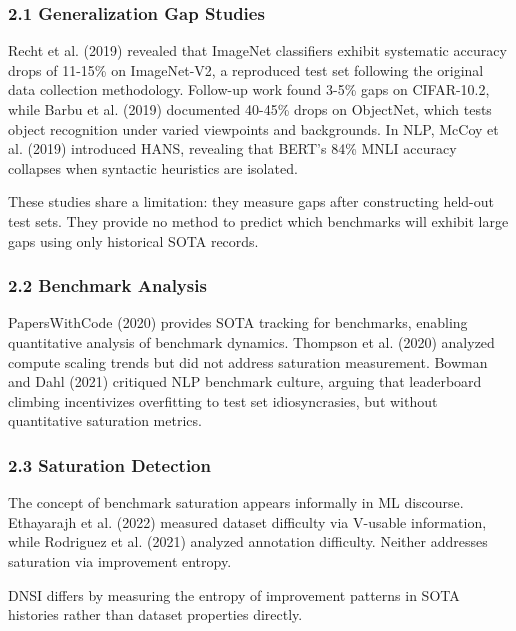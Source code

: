 
\subsubsection{2.1 Generalization Gap Studies}

Recht et al. (2019) revealed that ImageNet classifiers exhibit systematic accuracy drops of 11-15\% on ImageNet-V2, a reproduced test set following the original data collection methodology. Follow-up work found 3-5\% gaps on CIFAR-10.2, while Barbu et al. (2019) documented 40-45\% drops on ObjectNet, which tests object recognition under varied viewpoints and backgrounds. In NLP, McCoy et al. (2019) introduced HANS, revealing that BERT's 84\% MNLI accuracy collapses when syntactic heuristics are isolated.

These studies share a limitation: they measure gaps after constructing held-out test sets. They provide no method to predict which benchmarks will exhibit large gaps using only historical SOTA records.

\subsubsection{2.2 Benchmark Analysis}

PapersWithCode (2020) provides SOTA tracking for benchmarks, enabling quantitative analysis of benchmark dynamics. Thompson et al. (2020) analyzed compute scaling trends but did not address saturation measurement. Bowman and Dahl (2021) critiqued NLP benchmark culture, arguing that leaderboard climbing incentivizes overfitting to test set idiosyncrasies, but without quantitative saturation metrics.

\subsubsection{2.3 Saturation Detection}

The concept of benchmark saturation appears informally in ML discourse. Ethayarajh et al. (2022) measured dataset difficulty via V-usable information, while Rodriguez et al. (2021) analyzed annotation difficulty. Neither addresses saturation via improvement entropy.

DNSI differs by measuring the entropy of improvement patterns in SOTA histories rather than dataset properties directly.
